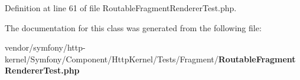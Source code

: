 Definition at line 61 of file Routable\+Fragment\+Renderer\+Test.\+php.



The documentation for this class was generated from the following file\+:\begin{DoxyCompactItemize}
\item 
vendor/symfony/http-\/kernel/\+Symfony/\+Component/\+Http\+Kernel/\+Tests/\+Fragment/{\bf Routable\+Fragment\+Renderer\+Test.\+php}\end{DoxyCompactItemize}
